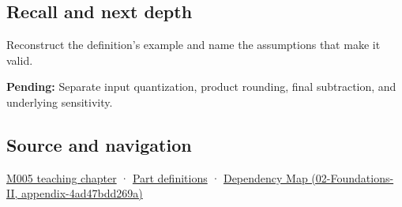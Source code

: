 \subsection{Recall and next depth}\label{recall-and-next-depth}

Reconstruct the definition's example and name the assumptions that make it valid.

\textbf{Pending:} Separate input quantization, product rounding, final subtraction, and underlying sensitivity.

\subsection{Source and navigation}\label{source-and-navigation}

\href{Continuous\%20Notes/Computing\%20Foundations\%20-\%20From\%20Bits\%20to\%20C++\%20and\%20Systems\%20APIs\#When\%20arithmetic\%20meets\%20uncertainty}{M005 teaching chapter} · \hyperref[appendix-fd090d982a15]{Part definitions} · \href{}{Dependency Map (02-Foundations-II, appendix-4ad47bdd269a)}
